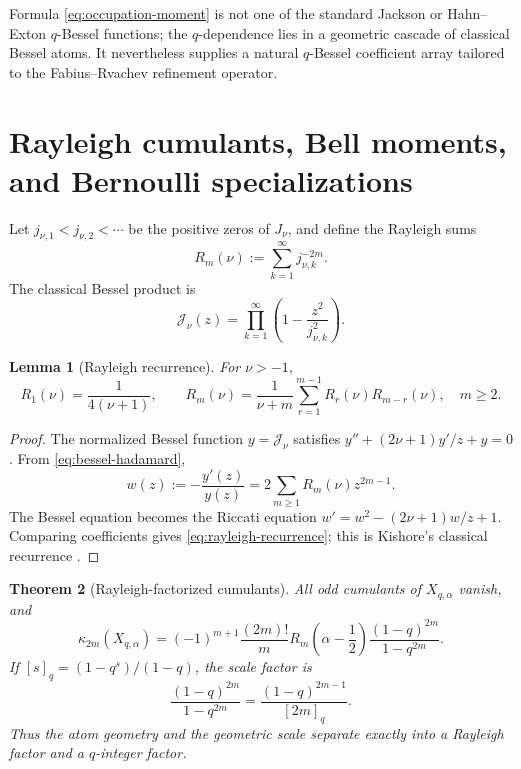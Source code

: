 \documentclass[11pt]{article}
\newtheorem{theorem}{Theorem}[section]
\newtheorem{lemma}[theorem]{Lemma}
\theoremstyle{definition}
\theoremstyle{remark}
\newcommand{\Jcal}{\mathcal{J}}
\begin{document}
Formula \eqref{eq:occupation-moment} is not one of the standard Jackson or
Hahn--Exton \(q\)-Bessel functions; the \(q\)-dependence lies in a geometric
cascade of classical Bessel atoms.  It nevertheless supplies a natural
\(q\)-Bessel coefficient array tailored to the Fabius--Rvachev refinement
operator.

\section{Rayleigh cumulants, Bell moments, and Bernoulli specializations}
\label{sec:cumulants}

Let \(j_{\nu,1}<j_{\nu,2}<\cdots\) be the positive zeros of \(J_\nu\), and
define the Rayleigh sums
\begin{equation}
 R_m(\nu):=\sum_{k=1}^{\infty}j_{\nu,k}^{-2m}.
 \label{eq:rayleigh-definition}
\end{equation}
The classical Bessel product is
\begin{equation}
 \Jcal_\nu(z)=\prod_{k=1}^{\infty}
 \left(1-\frac{z^2}{j_{\nu,k}^2}\right).
 \label{eq:bessel-hadamard}
\end{equation}

\begin{lemma}[Rayleigh recurrence]
\label{lem:rayleigh-recurrence}
For \(\nu>-1\),
\begin{equation}
 R_1(\nu)=\frac1{4(\nu+1)},\qquad
 R_m(\nu)=\frac1{\nu+m}
 \sum_{r=1}^{m-1}R_r(\nu)R_{m-r}(\nu),\quad m\ge2.
 \label{eq:rayleigh-recurrence}
\end{equation}
\end{lemma}

\begin{proof}
The normalized Bessel function \(y=\Jcal_\nu\) satisfies
\(y''+(2\nu+1)y'/z+y=0\).  From \eqref{eq:bessel-hadamard},
\[
 w(z):=-\frac{y'(z)}{y(z)}=2\sum_{m\ge1}R_m(\nu)z^{2m-1}.
\]
The Bessel equation becomes the Riccati equation
\(w'=w^2-(2\nu+1)w/z+1\).  Comparing coefficients gives
\eqref{eq:rayleigh-recurrence}; this is Kishore's classical recurrence
\cite{Kishore1963,GuptaMuldoon2000}.
\end{proof}

\begin{theorem}[Rayleigh-factorized cumulants]
\label{thm:cumulants}
All odd cumulants of \(X_{q,\alpha}\) vanish, and
\begin{equation}
 \boxed{
 \kappa_{2m}(X_{q,\alpha})
 =(-1)^{m+1}\frac{(2m)!}{m}
 R_m\!\left(\alpha-\frac12\right)
 \frac{(1-q)^{2m}}{1-q^{2m}}.}
 \label{eq:master-cumulant}
\end{equation}
If \([s]_q=(1-q^s)/(1-q)\), the scale factor is
\begin{equation}
 \frac{(1-q)^{2m}}{1-q^{2m}}
 =\frac{(1-q)^{2m-1}}{[2m]_q}.
 \label{eq:q-integer-factor}
\end{equation}
Thus the atom geometry and the geometric scale separate exactly into a
Rayleigh factor and a \(q\)-integer factor.
\end{theorem}
\end{document}
